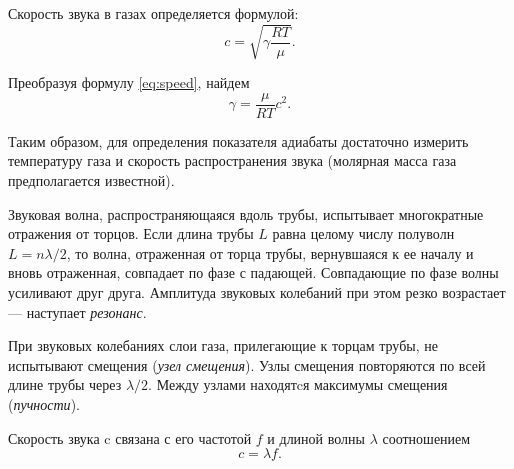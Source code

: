 \documentclass[12pt]{article}
\begin{document}
			
			Скорость звука в газах определяется формулой:
			\begin{equation}\label{eq:speed}
			c=\sqrt{\gamma\dfrac{RT}{\mu}}.			
			\end{equation}
			
			Преобразуя формулу \ref{eq:speed}, найдем
			\begin{equation}\label{eq:speed2}
			\gamma=\dfrac{\mu}{RT}c^2.			
			\end{equation}
			
			Таким образом, для определения показателя адиабаты достаточно измерить температуру газа
			и скорость распространения звука (молярная масса газа предполагается известной). 
			
			Звуковая волна, распространяющаяся вдоль трубы, испытывает многократные отражения от торцов.
			Если длина трубы $L$ равна целому числу полуволн $L=n\lambda/2$, то волна, отраженная от торца трубы, вернувшаяся к ее началу и вновь отраженная, совпадает по фазе с падающей. Совпадающие по фазе волны усиливают друг друга. Амплитуда звуковых	колебаний при этом резко возрастает	— наступает \textit{резонанс}.  		
			
			При звуковых колебаниях слои газа, прилегающие к торцам трубы, не испытывают смещения (\textit{узел смещения}). Узлы смещения повторяются по всей длине трубы через $\lambda/2$. Между узлами находятcя
			максимумы смещения (\textit{пучности}).
			
			Скорость звука c связана с его частотой $f$ и длиной волны $\lambda$ соотношением
			\begin{equation}\label{eq:c}
				c=\lambda f.
			\end{equation}
			
\end{document}
